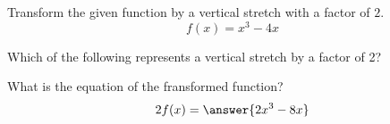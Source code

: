 \documentclass{ximera}
\author{Ivo Terek}
\begin{document}
Transform the given function by a vertical stretch with a factor of $2$.
\[
f(x)=x^3-4x
\]
\begin{exercise}
Which of the following represents a vertical stretch by a factor of 2?
\begin{multipleChoice}
\end{multipleChoice}
\end{exercise}
\begin{exercise}
What is the equation of the fransformed function?
\[
2f(x)=\answer{2x^3-8x}
\]

\end{exercise}
\end{document}
